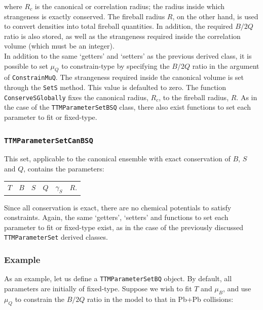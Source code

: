 \documentclass{elsarticle}
\begin{document}
\noindent
where $R_c$ is the canonical or correlation radius; the radius inside 
which strangeness is exactly conserved. The fireball radius $R$, on the other hand, is used to 
convert densities into total 
fireball quantities. In addition, the required $B/2Q$ 
ratio is also stored, as well as the strangeness required inside the
correlation volume (which must be an integer).\\ 

In addition to the same `getters' and `setters' as the previous derived class, it is possible to set 
$\mu_Q$ to constrain-type by specifying the $B/2Q$ ratio in the argument of 
\texttt{ConstrainMuQ}. The strangeness required inside the canonical
volume is set through the \texttt{SetS} method. This value is
defaulted to zero. The function \texttt{ConserveSGlobally} fixes the 
canonical radius, $R_c$, to the 
fireball radius, $R$. As in the case of the \texttt{TTMParameterSetBSQ} class, there also exist 
functions to set each parameter to fit or fixed-type.\\

\subsubsection{\texttt{TTMParameterSetCanBSQ}}
This set, applicable to the canonical ensemble with exact conservation of $B$, $S$ and $Q$, contains 
the parameters:\\
\begin{center}
\begin{tabular}{cccccc}
$T$ & $B$ & $S$ & $Q$ & $\gamma_S$ & $R$.\\
\end{tabular}
\end{center}

\noindent
Since all conservation is exact, there are no chemical potentials to satisfy constraints. Again, the same 
`getters', `setters' and functions to set each parameter to fit or fixed-type exist, as in the case 
of the previously discussed \texttt{TTMParameterSet} derived classes.\\

\subsubsection{Example}

As an example, let us define a \texttt{TTMParameterSetBQ} object. By default, all 
parameters are initially of fixed-type. Suppose we wish to fit $T$ and 
$\mu_B$, and use $\mu_Q$ to constrain the $B/2Q$ ratio in the model to that 
in Pb+Pb collisions:
\end{document}
